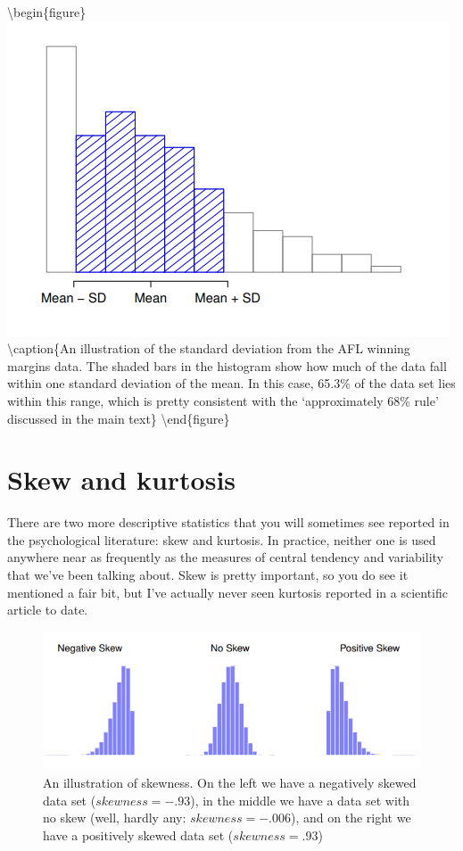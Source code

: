 \documentclass[
]{book}
\begin{document}
\textbackslash begin\{figure\}
\includegraphics[width=0.9\linewidth]{images/Figure17} \textbackslash caption\{An illustration of the standard deviation from the AFL winning margins data. The shaded bars in the histogram show how much of the data fall within one standard deviation of the mean. In this case, 65.3\% of the data set lies within this range, which is pretty consistent with the `approximately 68\% rule' discussed in the main text\}\label{fig:fig4-10}
\textbackslash end\{figure\}

\hypertarget{skew-and-kurtosis}{%
\section{Skew and kurtosis}\label{skew-and-kurtosis}}

There are two more descriptive statistics that you will sometimes see reported in the psychological literature: skew and kurtosis. In practice, neither one is used anywhere near as frequently as the measures of central tendency and variability that we've been talking about. Skew is pretty important, so you do see it mentioned a fair bit, but I've actually never seen kurtosis reported in a scientific article to date.

\begin{figure}
\includegraphics[width=0.9\linewidth]{images/Figure18} \caption{An illustration of skewness. On the left we have a negatively skewed data set ($skewness = -.93$), in the middle we have a data set with no skew (well, hardly any: $skewness = -.006$), and on the right we have a positively skewed data set ($skewness = .93$)}\label{fig:fig4-11}
\end{figure}
\end{document}
